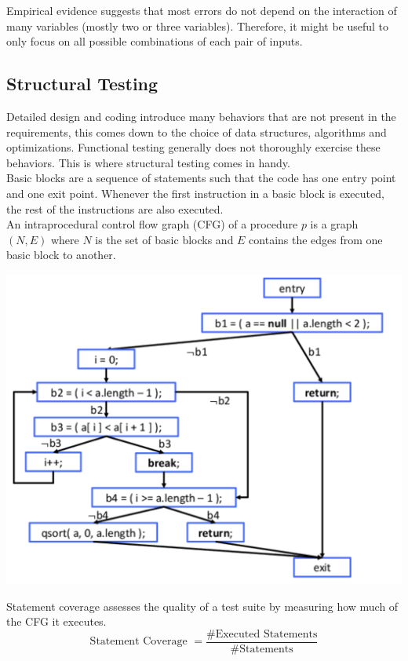 Empirical evidence suggests that most errors do not depend on the interaction of many variables (mostly two or three variables). Therefore, it might be useful to only focus on all possible combinations of each pair of inputs.


\subsection{Structural Testing}

Detailed design and coding introduce many behaviors that are not present in the requirements, this comes down to the choice of data structures, algorithms and optimizations. Functional testing generally does not thoroughly exercise these behaviors. This is where structural testing comes in handy. \\

Basic blocks are a sequence of statements such that the code has one entry point and one exit point. Whenever the first instruction in a basic block is executed, the rest of the instructions are also executed. \\

An intraprocedural control flow graph (CFG) of a procedure $p$ is a graph $(N,E)$ where $N$ is the set of basic blocks and $E$ contains the edges from one basic block to another.

\begin{center}
	\includegraphics[width=0.8\columnwidth]{assets/cfg}
\end{center}

Statement coverage assesses the quality of a test suite by measuring how much of the CFG it executes.
$$\text{Statement Coverage } = \frac{\text{\#Executed Statements}}{\text{\#Statements}}$$

